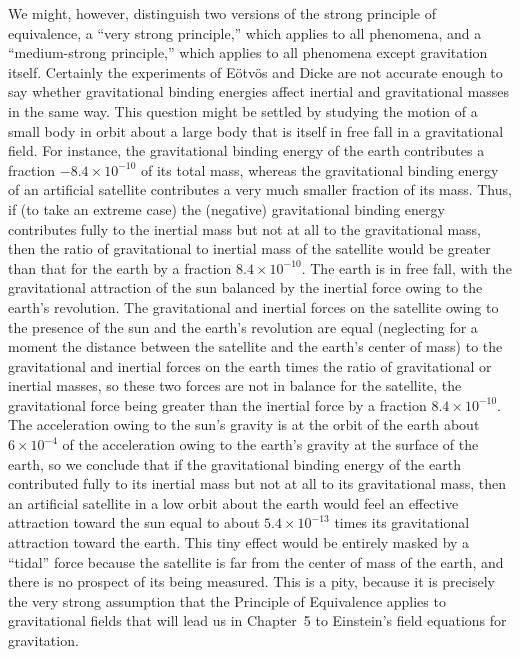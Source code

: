 We might, however, distinguish two versions of the strong principle of
equivalence, a ``very strong principle,'' which applies to all phenomena, and
a ``medium-strong principle,'' which applies to all phenomena except
gravitation itself. Certainly the experiments of E\"otv\"os and Dicke are not
accurate enough to say whether gravitational binding energies affect
inertial and gravitational masses in the same way. This question might be
settled by studying the motion of a small body in orbit about a large body
that is itself in free fall in a gravitational field. For instance, the
gravitational binding energy of the earth contributes a fraction
$-8.4\times10^{-10}$ of its total mass, whereas the gravitational binding
energy of an artificial satellite contributes a very much smaller fraction
of its mass. Thus, if (to take an extreme case) the (negative) gravitational
binding energy contributes fully to the inertial mass but not at all to the
gravitational mass, then the ratio of gravitational to inertial mass of the
satellite would be greater than that for the earth by a fraction
$8.4\times10^{-10}$. The earth is in free fall, with the gravitational
attraction of the sun balanced by the inertial force owing to the earth's
revolution. The gravitational and inertial forces on the satellite owing to
the presence of the sun and the earth's revolution are equal (neglecting for
a moment the distance between the satellite and the earth's center of mass)
to the gravitational and inertial forces on the earth times the ratio of
gravitational or inertial masses, so these two forces are not in balance for
the satellite, the gravitational force being greater than the inertial force
by a fraction $8.4\times10^{-10}$. The acceleration owing to the sun's
gravity is at the orbit of the earth about $6\times10^{-4}$ of the
acceleration owing to the earth's gravity at the surface of the earth, so we
conclude that if the gravitational binding energy of the earth contributed
fully to its inertial mass but not at all to its gravitational mass, then an
artificial satellite in a low orbit about the earth would feel an effective
attraction toward the sun equal to about $5.4\times10^{-13}$ times its
gravitational attraction toward the earth. This tiny effect would be
entirely masked by a ``tidal'' force because the satellite is far from the
center of mass of the earth, and there is no prospect of its being measured.
This is a pity, because it is precisely the very strong assumption that the
Principle of Equivalence applies to gravitational fields that will lead us
in Chapter~5 to Einstein's field equations for gravitation.
